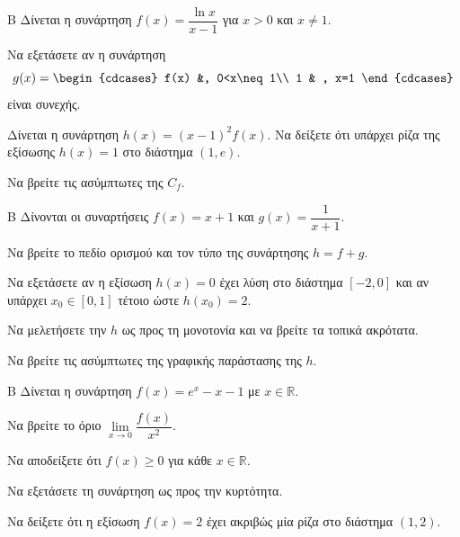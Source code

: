 \begin{thema}{Β}
Δίνεται η συνάρτηση $f(x) = \dfrac{\ln x}{x-1}$ για $x > 0$ και $x \ne 1$.
\begin{erwthma}
\item Να εξετάσετε αν η συνάρτηση
\[g(x)=\begin{cdcases}
f(x) &, 0<x\neq 1\\ 1 & , x=1
\end{cdcases}\]
είναι συνεχής.
\item Δίνεται η συνάρτηση $h(x) = (x-1)^2f(x)$. Να δείξετε ότι υπάρχει ρίζα της εξίσωσης $h(x) = 1$ στο διάστημα $(1, e)$.
\item Να βρείτε τις ασύμπτωτες της $C_f$.
\end{erwthma}
\end{thema}

\begin{thema}{Β}
Δίνονται οι συναρτήσεις $f(x) = x+1$ και $g(x) = \dfrac{1}{x+1}$.
\begin{erwthma}
\item Να βρείτε το πεδίο ορισμού και τον τύπο της συνάρτησης $h = f + g$.
\item Να εξετάσετε αν η εξίσωση $h(x)=0$ έχει λύση στο διάστημα $[-2, 0]$ και αν υπάρχει $x_0 \in [0, 1]$ τέτοιο ώστε $h(x_0)=2$.
\item Να μελετήσετε την $h$ ως προς τη μονοτονία και να βρείτε τα τοπικά ακρότατα.
\item Να βρείτε τις ασύμπτωτες της γραφικής παράστασης της $h$.
\end{erwthma}
\end{thema}

\begin{thema}{Β}
Δίνεται η συνάρτηση $f(x) = e^x - x - 1$ με $x \in \mathbb{R}$.
\begin{erwthma}
\item Να βρείτε το όριο $\lim\limits_{x \to 0} \dfrac{f(x)}{x^2}$.
\item Να αποδείξετε ότι $f(x) \ge 0$ για κάθε $x \in \mathbb{R}$.
\item Να εξετάσετε τη συνάρτηση ως προς την κυρτότητα.
\item Να δείξετε ότι η εξίσωση $f(x) = 2$ έχει ακριβώς μία ρίζα στο διάστημα $(1, 2)$.
\end{erwthma}
\end{thema}

